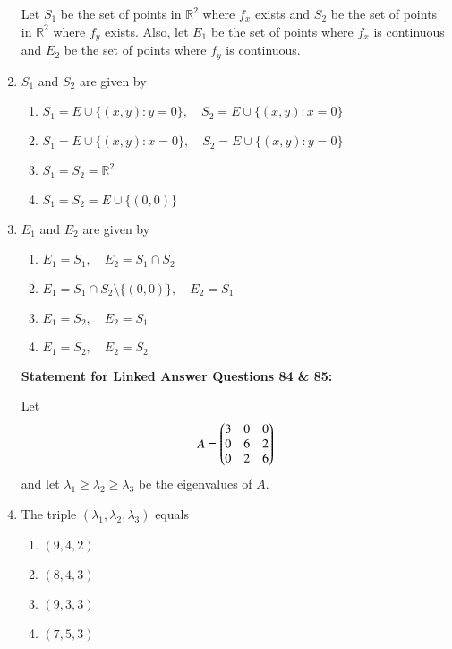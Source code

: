 \documentclass[journal]{IEEEtran}
\numberwithin{equation}{enumi}
\numberwithin{figure}{enumi}
\begin{document}
\begin{enumerate}
Let $S_1$ be the set of points in $\mathbb{R}^2$ where $f_x$ exists and $S_2$ be the set of points in $\mathbb{R}^2$ where $f_y$ exists. Also, let $E_1$ be the set of points where $f_x$ is continuous and $E_2$ be the set of points where $f_y$ is continuous.

\item $S_1$ and $S_2$ are given by      \hfill{}
\begin{enumerate}
    \item $S_1 = E \cup \{(x, y): y = 0\},\quad S_2 = E \cup \{(x, y): x = 0\}$
    \item $S_1 = E \cup \{(x, y): x = 0\},\quad S_2 = E \cup \{(x, y): y = 0\}$
    \item $S_1 = S_2 = \mathbb{R}^2$
    \item $S_1 = S_2 = E \cup \{(0, 0)\}$
\end{enumerate}




\item $E_1$ and $E_2$ are given by      \hfill{}

\begin{enumerate}
    \item $E_1 = S_1,\quad E_2 = S_1 \cap S_2$
    \item $E_1 = S_1 \cap S_2 \setminus \{(0,0)\},\quad E_2 = S_1$
    \item $E_1 = S_2,\quad E_2 = S_1$
    \item $E_1 = S_2,\quad E_2 = S_2$
\end{enumerate}

\newpage

\textbf{Statement for Linked Answer Questions 84 \& 85:}

Let
\begin{align*}
A = \begin{pmatrix}
3 & 0 & 0 \\
0 & 6 & 2 \\
0 & 2 & 6
\end{pmatrix}
\end{align*}
and let $\lambda_1 \geq \lambda_2 \geq \lambda_3$ be the eigenvalues of $A$.

\item The triple $(\lambda_1, \lambda_2, \lambda_3)$ equals    \hfill{}
\begin{multicols}{2}
    \begin{enumerate}
        \item $(9, 4, 2)$
        \item $(8, 4, 3)$
        \item $(9, 3, 3)$
        \item $(7, 5, 3)$
    \end{enumerate}
    \end{multicols}





\end{enumerate}
\end{document}
